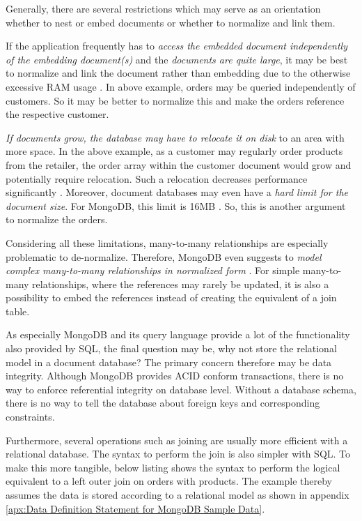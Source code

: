 Generally, there are several restrictions which may serve as an orientation whether to nest or embed documents or whether to normalize and link them. \par 
If the application frequently has to \emph{access the embedded document independently of the embedding document(s)} and the \emph{documents are quite large}, it may be best to normalize and link the document rather than embedding due to the otherwise excessive RAM usage \cite{MongoDBAppliedDesign}. In above example, orders may be queried independently of customers. So it may be better to normalize this and make the orders reference the respective customer.\par 
\emph{If documents grow, the database may have to relocate it on disk} to an area with more space. In the above example, as a customer may regularly order products from the retailer, the order array within the customer document would grow and potentially require relocation. Such a relocation decreases performance significantly \cite{MongoDBAppliedDesign}. Moreover, document databases may even have a \emph{hard limit for the document size}. For MongoDB, this limit is 16MB \cite{MongoDBDocumentSizeLimit}. So, this is another argument to normalize the orders.\par 
Considering all these limitations, many-to-many relationships are especially problematic to de-normalize. Therefore, MongoDB even suggests to \emph{model complex many-to-many relationships in normalized form} \cite{MongoDBDataModeling}. For simple many-to-many relationships, where the references may rarely be updated, it is also a possibility to embed the references instead of creating the equivalent of a join table.\par
As especially MongoDB and its query language provide a lot of the functionality also provided by SQL, the final question may be, why not store the relational model in a document database? The primary concern therefore may be data integrity. Although MongoDB provides ACID conform transactions, there is no way to enforce referential integrity on database level. Without a database schema, there is no way to tell the database about foreign keys and corresponding constraints.\par Furthermore, several operations such as joining are usually more efficient with a relational database. The syntax to perform the join is also simpler with SQL. To make this more tangible, below listing shows the syntax to perform the logical equivalent to a left outer join on orders with products. The example thereby assumes the data is stored according to a relational model as shown in appendix \ref{apx:Data Definition Statement for MongoDB Sample Data}. 

